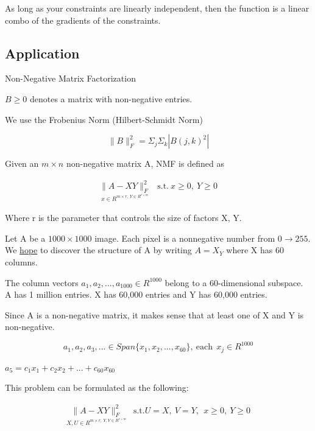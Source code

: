 \documentclass[11pt]{article}
\begin{document}
As long as your constraints are linearly independent, then the function is a
linear combo of the gradients of the constraints.


\subsection{Application}
\label{sec:org7558d0b}

Non-Negative Matrix Factorization

\(B \geq 0\) denotes a matrix with non-negative entries.

We use the Frobenius Norm (Hilbert-Schmidt Norm)

$$
\|B\|_F^2 = \Sigma_j \Sigma_k |B(j, k)^2|
$$

Given an \(m \times n\) non-negative matrix A, NMF is defined as

\begin{equation}
\begin{split}
\underset{x \in R^{m \times r, \ Y \in R^{r \times m}}}{\|A - XY\|_F^2} & \text{s.t.} \ x \geq 0, \ Y \geq 0
\end{split}
\end{equation}

Where r is the parameter that controls the size of factors X, Y.

Let A be a \(1000 \times 1000\) image. Each pixel is a nonnegative number from \(0
\to 255\). We \uline{hope} to discover the structure of A by writing \(A = X_Y\) where X
has 60 columns.

The column vectors \(a_1, a_2, ..., a_{1000} \in R^{1000}\) belong to a
60-dimensional subspace. A has 1 million entries. X has 60,000 entries and Y has
60,000 entries.

Since A is a non-negative matrix, it makes sense that at least one of X and Y is
non-negative.

$$
a_1, a_2, a_3, ... \in Span\{x_1, x_2, ..., x_{60}\}, \ \text{each} \ \ x_j \in R^{1000}
$$

\(a_5 = c_1 x_1 + c_2 x_2 + ... + c_{60} x_{60}\)

This problem can be formulated as the following:

\begin{equation}
\begin{split}
\underset{X,U \in R^{m \times r, \ Y,V \in R^{r \times m}}}{\|A - XY\|_F^2} & \text{s.t.} U = X, \ V = Y, \ \ x \geq 0, \ Y \geq 0
\end{split}
\end{equation}
\end{document}
